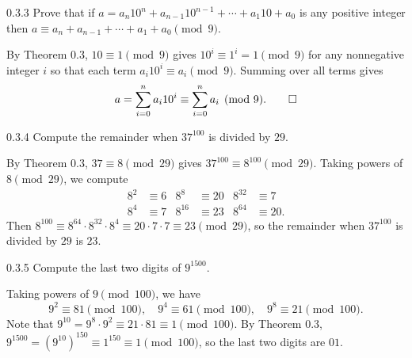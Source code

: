 \begin{exercise}{0.3.3}
    Prove that if $a = a_n 10^n + a_{n - 1}10^{n - 1} + \cdots + a_1 10 + a_0$ is any positive integer then $a \equiv a_n + a_{n - 1} + \cdots + a_1 + a_0 \pmod 9$.
\end{exercise}

\begin{sol}
    By Theorem 0.3, $10 \equiv 1 \pmod 9$ gives $10^i \equiv 1^i = 1 \pmod 9$ for any nonnegative integer $i$ so that each term $a_i 10^i \equiv a_i \pmod 9$.
    Summing over all terms gives
    \[
        a = \sum_{i=0}^{n} a_i 10^i \equiv \sum_{i=0}^{n} a_i \pmod 9. \qedhere
    \]
\end{sol}

\begin{exercise}{0.3.4}
    Compute the remainder when $37^{100}$ is divided by $29$.
\end{exercise}

\begin{sol}
    By Theorem 0.3, $37 \equiv 8 \pmod{29}$ gives $37^{100} \equiv 8^{100} \pmod{29}$.
    Taking powers of $8 \pmod{29}$, we compute
    \begin{align*}
        8^2 & \equiv 6 & 8^8 & \equiv 20 & 8^{32} & \equiv 7 \\
        8^4 & \equiv 7 & 8^{16} & \equiv 23 & 8^{64} & \equiv 20.
    \end{align*}
    Then $8^{100} \equiv 8^{64} \cdot 8^{32} \cdot 8^4 \equiv 20 \cdot 7 \cdot 7 \equiv 23 \pmod{29}$, so the remainder when $37^{100}$ is divided by $29$ is $23$.
\end{sol}

\begin{exercise}{0.3.5}
    Compute the last two digits of $9^{1500}$.

\end{exercise}

\begin{sol}
    Taking powers of $9 \pmod{100}$, we have
    \[
        9^2 \equiv 81 \pmod{100}, \quad 9^4 \equiv 61 \pmod{100}, \quad 9^8 \equiv 21 \pmod{100}.
    \]
    Note that $9^{10} = 9^8 \cdot 9^2 \equiv 21 \cdot 81 \equiv 1 \pmod{100}$.
    By Theorem 0.3, $9^{1500} = (9^{10})^{150} \equiv 1^{150} \equiv 1 \pmod{100}$, so the last two digits are $01$.
\end{sol}

